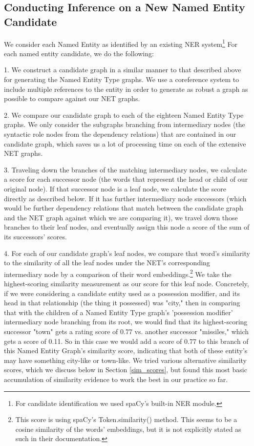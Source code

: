 \documentclass[11pt,a4paper]{article}
\begin{document}
\subsection{Conducting Inference on a New Named Entity Candidate}

We consider each Named Entity as identified by an existing NER system\footnote{For candidate identification we used spaCy's \cite{spacy2} built-in NER module.} For each named entity candidate, we do the following:

1. We construct a candidate graph in a similar manner to that described above for generating the Named Entity Type graphs. We use a coreference system to include multiple references to the entity in order to generate as robust a graph as possible to compare against our NET graphs.

2. We compare our candidate graph to each of the eighteen Named Entity Type graphs. We only consider the subgraphs branching from intermediary nodes (the syntactic role nodes from the dependency relations) that are contained in our candidate graph, which saves us a lot of processing time on each of the extensive NET graphs.

3. Traveling down the branches of the matching intermediary nodes, we calculate a score for each successor node (the words that represent the head or child of our original node). If that successor node is a leaf node, we calculate the score directly as described below. If it has further intermediary node successors (which would be further dependency relations that match between the candidate graph and the NET graph against which we are comparing it), we travel down those branches to their leaf nodes, and eventually assign this node a score of the sum of its successors' scores.

4. For each of our candidate graph's leaf nodes, we compare that word's similarity to the similarity of all the leaf nodes under the NET's corresponding intermediary node by a comparison of their word embeddings.\footnote{This score is using spaCy's Token.similarity() method. This seems to be a cosine similarity of the words' embeddings, but it is not explicitly stated as such in their documentation.} We take the highest-scoring similarity measurement as our score for this leaf node. Concretely, if we were considering a candidate entity used as a possession modifier, and its head in that relationship (the thing it possessed) was "city," then in comparing that with the children of a Named Entity Type graph's 'possession modifier' intermediary node branching from its root, we would find that its highest-scoring successor "town" gets a rating score of 0.77 vs. another successor "missiles," which gets a score of 0.11. So in this case we would add a score of 0.77 to this branch of this Named Entity Graph's similarity score, indicating that both of these entity's may have something city-like or town-like. We tried various alternative similarity scores, which we discuss below in Section \ref{sim_scores}, but found this most basic accumulation of similarity evidence to work the best in our practice so far. 
\end{document}
